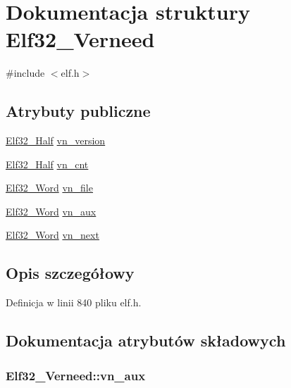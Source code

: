\hypertarget{struct_elf32___verneed}{\section{Dokumentacja struktury Elf32\-\_\-\-Verneed}
\label{struct_elf32___verneed}
}


{\ttfamily \#include $<$elf.\-h$>$}

\subsection*{Atrybuty publiczne}
\begin{DoxyCompactItemize}
\item 
\hyperlink{elf_8h_a2ff0787d7d1bae0f251192806a2974ca}{Elf32\-\_\-\-Half} \hyperlink{struct_elf32___verneed_ae87cf6c64587fcf3cd80ba2f6aa6b1bb}{vn\-\_\-version}
\item 
\hyperlink{elf_8h_a2ff0787d7d1bae0f251192806a2974ca}{Elf32\-\_\-\-Half} \hyperlink{struct_elf32___verneed_a8c8c56b63ee1f38cf5568fa7bd5b4f73}{vn\-\_\-cnt}
\item 
\hyperlink{elf_8h_af5924ece606c732e86f8263a19408e45}{Elf32\-\_\-\-Word} \hyperlink{struct_elf32___verneed_a71c12598274c795cca809b99462e062a}{vn\-\_\-file}
\item 
\hyperlink{elf_8h_af5924ece606c732e86f8263a19408e45}{Elf32\-\_\-\-Word} \hyperlink{struct_elf32___verneed_a0db7ff11ee775f27ebb1e10a6affabb8}{vn\-\_\-aux}
\item 
\hyperlink{elf_8h_af5924ece606c732e86f8263a19408e45}{Elf32\-\_\-\-Word} \hyperlink{struct_elf32___verneed_ae3819b6239b81ed5c8ce4f8710176870}{vn\-\_\-next}
\end{DoxyCompactItemize}


\subsection{Opis szczegółowy}


Definicja w linii 840 pliku elf.\-h.



\subsection{Dokumentacja atrybutów składowych}
\hypertarget{struct_elf32___verneed_a0db7ff11ee775f27ebb1e10a6affabb8}{
\subsubsection[{vn\-\_\-aux}]{ Elf32\-\_\-\-Verneed\-::vn\-\_\-aux}}\label{struct_elf32___verneed_a0db7ff11ee775f27ebb1e10a6affabb8}


